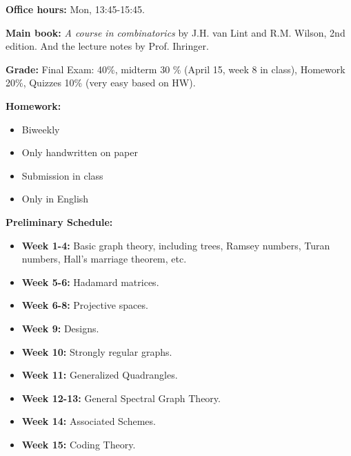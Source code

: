 \documentclass[11pt, a4paper]{ctexrep}
\begin{document}
\begin{tcolorbox}[
        enhanced,
        title=\textbf{Basic Information},
        colframe=TopicColor,
        colback=TopicBg,
        coltitle=white,
        boxrule=0.5pt,
        drop shadow=black!5!white,
        breakable
    ]
    \textbf{\textcolor{TopicColor}{Office hours:}} Mon, 13:45-15:45.

    \textbf{\textcolor{TopicColor}{Main book:}} \textit{A course in combinatorics} by J.H. van Lint and R.M. Wilson, 2nd edition. And the lecture notes by Prof. Ihringer.

    \textbf{\textcolor{TopicColor}{Grade:}} Final Exam: 40\%, midterm 30 \% (April 15, week 8 in class), Homework 20\%, Quizzes 10\% (very easy based on HW).

    \tcbline

    \textbf{\textcolor{TopicColor}{Homework:}}
    \begin{itemize}[nosep, leftmargin=*]
        \item Biweekly
        \item Only handwritten on paper
        \item Submission in class
        \item Only in English
    \end{itemize}

    \tcbline

    \textbf{\textcolor{TopicColor}{Preliminary Schedule:}}
    \begin{itemize}[nosep, leftmargin=*]
        \item \textbf{Week 1-4:} Basic graph theory, including trees, Ramsey numbers, Turan numbers, Hall's marriage theorem, etc.
        \item \textbf{Week 5-6:} Hadamard matrices.
        \item \textbf{Week 6-8:} Projective spaces.
        \item \textbf{Week 9:} Designs.
        \item \textbf{Week 10:} Strongly regular graphs.
        \item \textbf{Week 11:} Generalized Quadrangles.
        \item \textbf{Week 12-13:} General Spectral Graph Theory.
        \item \textbf{Week 14:} Associated Schemes.
        \item \textbf{Week 15:} Coding Theory.
    \end{itemize}
\end{tcolorbox}
\end{document}
